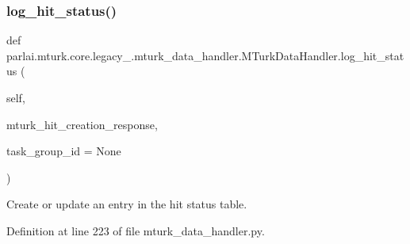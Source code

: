 \subsubsection{\texorpdfstring{log\+\_\+hit\+\_\+status()}{log\_hit\_status()}}
{\footnotesize\ttfamily def parlai.\+mturk.\+core.\+legacy\+\_.\+mturk\+\_\+data\+\_\+handler.\+M\+Turk\+Data\+Handler.\+log\+\_\+hit\+\_\+status (\begin{DoxyParamCaption}\item[{}]{self,  }\item[{}]{mturk\+\_\+hit\+\_\+creation\+\_\+response,  }\item[{}]{task\+\_\+group\+\_\+id = {\ttfamily None} }\end{DoxyParamCaption})}

\begin{DoxyVerb}Create or update an entry in the hit status table.
\end{DoxyVerb}
 

Definition at line 223 of file mturk\+\_\+data\+\_\+handler.\+py.


